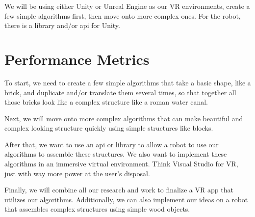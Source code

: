 \documentclass[letterpaper,10pt,onecolumn]{IEEEtran}
\begin{document}
We will be using either Unity or Unreal Engine as our VR environments, create a few simple algorithms first, then move onto more complex ones. For the robot, there is a library and/or api for Unity.  



\section{\textbf{Performance Metrics}}

To start, we need to create a few simple algorithms that take a basic shape, like a brick, and duplicate and/or translate them several times, so that together all those bricks look like a complex structure like a roman water canal. 

Next, we will move onto more complex algorithms that can make beautiful and complex looking structure quickly using simple structures like blocks. 

After that, we want to use an api or library to allow a robot to use our algorithms to assemble these structures. We also want to implement these algorithms in an immersive virtual environment. Think Visual Studio for VR, just with way more power at the user's disposal. 

Finally, we will combine all our research and work to finalize a VR app that utilizes our algorithms. Additionally, we can also implement our ideas on a robot that assembles complex structures using simple wood objects. 
 

	
\iffalse	
\begin{thebibliography}{4}
\bibitem{first}
F. Author. (year). 
\textit{title} 
. [Online]. Available: 
\\\url{url}
\end{thebibliography}
\fi
\end{document}
